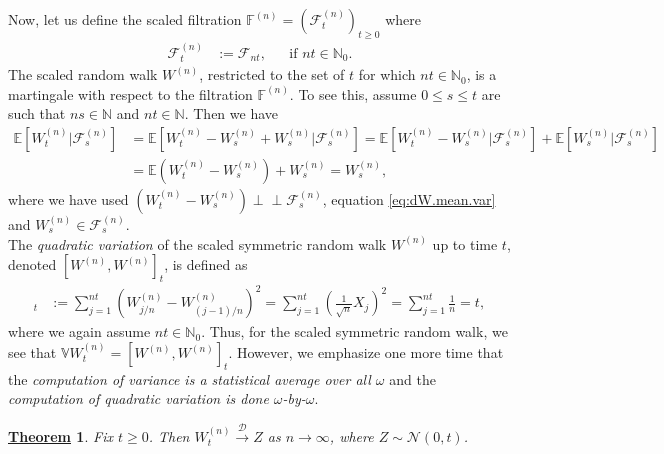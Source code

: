 \documentclass[12pt]{book}
\numberwithin{equation}{chapter}
\theoremstyle{plain}
\newtheorem{theorem}{\underline{Theorem}}
\numberwithin{theorem}{section}
\theoremstyle{definition}
\numberwithin{exercise}{chapter}
\newcommand{\<}{\langle}
\renewcommand{\>}{\rangle}
\renewcommand{\(}{\left(}
\renewcommand{\)}{\right)}
\renewcommand{\[}{\left[}
\renewcommand{\]}{\right]}
\newcommand\Eb{\mathds{E}}
\newcommand\Fb{\mathds{F}}
\newcommand\Nb{\mathds{N}}
\newcommand\Vb{\mathds{V}}
\newcommand\Dc{\mathscr{D}}
\newcommand\Fc{\mathscr{F}}
\newcommand\Nc{\mathscr{N}}
\newcommand\om{\omega}
\newcommand{\ind}{\perp \! \! \! \perp}
\begin{document}
Now, let us define the scaled filtration $\Fb^{(n)} = (\Fc_t^{(n)})_{t \geq 0}$ where
\begin{align}
\Fc_t^{(n)}
	&:= \Fc_{nt} , &
	& 	\text{if $nt \in \Nb_0$}.
\end{align}
The scaled random walk $W^{(n)}$, restricted to the set of $t$ for which $n t \in \Nb_0$, is a martingale with respect to the filtration $\Fb^{(n)}$.  
To see this, assume $0 \leq s \leq t$ are such that $ns \in \Nb$ and $nt \in \Nb$.  Then we have
\begin{align}
\Eb[ W_t^{(n)} | \Fc_s^{(n)} ]
	&= 	\Eb[ W_t^{(n)} - W_s^{(n)} + W_s^{(n)} | \Fc_s^{(n)} ]
	= 	\Eb[ W_t^{(n)} - W_s^{(n)} | \Fc_s^{(n)} ] + \Eb[ W_s^{(n)} | \Fc_s^{(n)} ] \\
	&= 	\Eb ( W_t^{(n)} - W_s^{(n)} ) +  W_s^{(n)} 
	=		W_s^{(n)} ,
\end{align}
where we have used $(W_t^{(n)} - W_s^{(n)}) \ind \Fc_s^{(n)}$, equation \eqref{eq:dW.mean.var} and $W_s^{(n)} \in \Fc_s^{(n)}$.
\\[0.5em]
The \emph{quadratic variation} of the scaled symmetric random walk $W^{(n)}$ up to time $t$, denoted $[W^{(n)},W^{(n)}]_t$, is defined as
\begin{align}
[W^{(n)},W^{(n)}]_t
	&:=	\sum_{j=1}^{nt} (W_{j/n}^{(n)} - W_{(j-1)/n}^{(n)} )^2
	=		\sum_{j=1}^{nt} \( \tfrac{1}{\sqrt{n}}X_j \)^2
	=		\sum_{j=1}^{nt} \tfrac{1}{n}
	=		t ,
\end{align}
where we again assume $nt \in \Nb_0$.
Thus, for the scaled symmetric random walk, we see that $\Vb W_t^{(n)} =  [W^{(n)},W^{(n)}]_t$.  However, we emphasize one more time that the \textit{computation of variance is a statistical average over all $\om$ }and the \textit{computation of quadratic variation is done $\om$-by-$\om$}.

\begin{theorem}
Fix $t \geq 0$.  Then $W_t^{(n)} \stackrel{\Dc}{\to} Z$ as $n \to \infty$, where $Z \sim \Nc(0,t)$.
\end{theorem}
\end{document}
